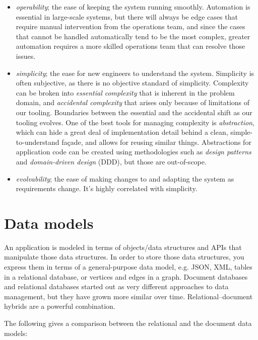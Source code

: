\documentclass[table, xcdraw]{article}%
\begin{document}
\begin{itemize}
    \item \textit{operability}; the ease of keeping the system running smoothly. Automation is essential in large-scale systems, but there will always be edge cases that require manual intervention from the operations team, and since the cases that cannot be handled automatically tend to be the most complex, greater automation requires a more skilled operations team that can resolve those issues.
    \item \textit{simplicity}; the ease for new engineers to understand the system. Simplicity is often subjective, as there is no objective standard of simplicity. Complexity can be broken into \textit{essential complexity} that is inherent in the problem domain, and \textit{accidental complexity} that arises only because of limitations of our tooling. Boundaries between the essential and the accidental shift as our tooling evolves. One of the best tools for managing complexity is \textit{abstraction}, which can hide a great deal of implementation detail behind a clean, simple-to-understand façade, and allows for reusing similar things. Abstractions for application code can be created using methodologies such as \textit{design patterns} and \textit{domain-driven design} (DDD), but those are out-of-scope.
    \item \textit{evolvability}; the ease of making changes to and adapting the system as requirements change. It's highly correlated with simplicity.
\end{itemize}

\section{Data models}

An application is modeled in terms of objects/data structures and APIs that manipulate those data structures. In order to store those data structures, you express them in terms of a general-purpose data model, e.g. JSON, XML, tables in a relational database, or vertices and edges in a graph. Document databases and relational databases started out as very different approaches to data management, but they have grown more similar over time. Relational–document hybrids are a powerful combination.

The following gives a comparison between the relational and the document data models:
\end{document}
